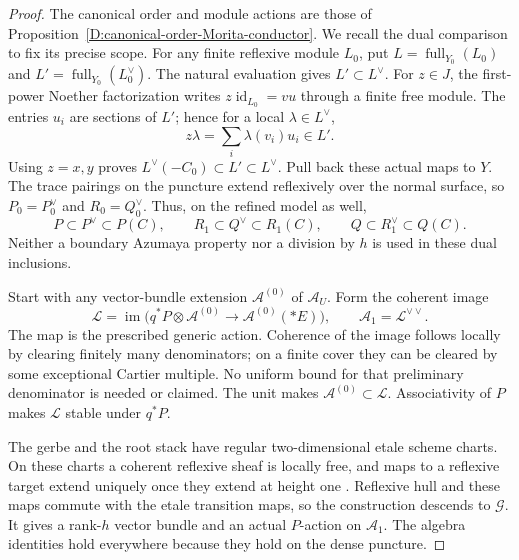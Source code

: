 \begin{proof}
The canonical order and module actions are those of
Proposition~\ref{D:canonical-order-Morita-conductor}.
We recall the dual comparison to fix its precise scope.
For any finite reflexive module $L_0$, put
$L=\operatorname{full}_{Y_0}(L_0)$ and
$L'=\operatorname{full}_{Y_0}(L_0^\vee)$.
The natural evaluation gives $L'\subset L^\vee$.
For $z\in J$, the first-power Noether factorization writes
$z\operatorname{id}_{L_0}=vu$ through a finite free module.
The entries $u_i$ are sections of $L'$; hence for a local
$\lambda\in L^\vee$,
\[
                 z\lambda=\sum_i\lambda(v_i)u_i\in L'.
                                                        \tag{D.BA.5}
\]
Using $z=x,y$ proves $L^\vee(-C_0)\subset L'\subset L^\vee$.
Pull back these actual maps to $Y$.
The trace pairings on the puncture extend reflexively over
the normal surface, so $P_0=P_0^\vee$ and $R_0=Q_0^\vee$.
Thus, on the refined model as well,
\[
 P\subset P^\vee\subset P(C),\qquad
 R_1\subset Q^\vee\subset R_1(C),\qquad
 Q\subset R_1^\vee\subset Q(C).                       \tag{D.BA.6}
\]
Neither a boundary Azumaya property nor a division by $h$
is used in these dual inclusions.

Start with any vector-bundle extension $\mathcal A^{(0)}$
of $\mathcal A_U$. Form the coherent image
\[
 \mathcal L=\operatorname{im}
   \bigl(q^*P\otimes\mathcal A^{(0)}
                   \longrightarrow\mathcal A^{(0)}(*E)\bigr),
             \qquad \mathcal A_1=\mathcal L^{\vee\vee}.
                                                        \tag{D.BA.7}
\]
The map is the prescribed generic action. Coherence of the
image follows locally by clearing finitely many denominators;
on a finite cover they can be cleared by some exceptional
Cartier multiple. No uniform bound for that preliminary
denominator is needed or claimed. The unit makes
$\mathcal A^{(0)}\subset\mathcal L$. Associativity of $P$
makes $\mathcal L$ stable under $q^*P$.

The gerbe and the root stack have regular two-dimensional
etale scheme charts. On these charts a coherent reflexive
sheaf is locally free, and maps to a reflexive target extend
uniquely once they extend at height one
\citep[Tags 0AVC and 0B3N; Lemmas 31.13.12--31.13.15]
{C_StacksRootAnchorReflexive}.
Reflexive hull and these maps commute with the etale
transition maps, so the construction descends to
$\mathcal G$. It gives a rank-$h$ vector bundle and an
actual $P$-action on $\mathcal A_1$. The algebra identities
hold everywhere because they hold on the dense puncture.


\end{proof}
